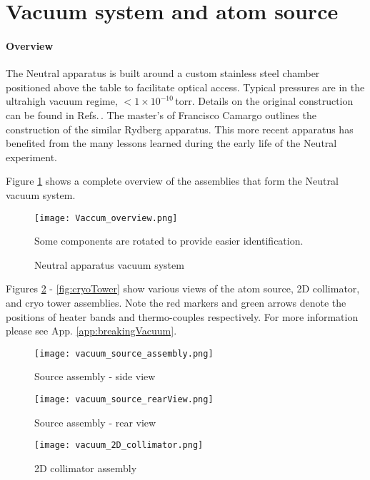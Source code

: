 \pagebreak
\section{Vacuum system and atom source} \label{sec:vac}
\setcounter{footnote}{0}
\paragraph{Overview}
	
The Neutral apparatus is built around a custom stainless steel chamber positioned above the table to facilitate optical access.
Typical pressures are in the ultrahigh vacuum regime, $<1\times10^{-10}$\,torr. 
Details on the original construction can be found in Refs.\,\cite{MartinezdeEscolar2010,Mickelson2010b}. 
The master's of Francisco Camargo \cite{Camargo2015} outlines the construction of the similar Rydberg apparatus. This more recent apparatus has benefited from the many lessons learned during the early life of the Neutral experiment.

Figure \ref{fig:vacuumSystem} shows a complete overview of the assemblies that form the Neutral vacuum system.
	\begin{figure} 
		\centerline{
		\texttt{[image: Vaccum\_overview.png]}}
		\caption{Neutral apparatus vacuum system}{Some components are rotated to provide easier identification.}
		\label{fig:vacuumSystem}
	\end{figure}		
Figures \ref{fig:sourceSideView} - \ref{fig:cryoTower} show various views of the atom source, 2D collimator, and cryo tower assemblies. Note the red markers and green arrows denote the positions of heater bands and thermo-couples respectively. For more information please see App. \ref{app:breakingVacuum}.
	\begin{figure} 
		\centerline{
		\texttt{[image: vacuum\_source\_assembly.png]}}
		\caption{Source assembly - side view}
		\label{fig:sourceSideView}
	\end{figure}
	
	\begin{figure} 
		\centerline{
		\texttt{[image: vacuum\_source\_rearView.png]}}
		\caption{Source assembly - rear view}
		\label{fig:sourceRearView}
	\end{figure}
	
	\begin{figure} 
		\centerline{
		\texttt{[image: vacuum\_2D\_collimator.png]}}
		\caption{2D collimator assembly}
		\label{fig:assembly_2Dcoll}
	\end{figure}
	
